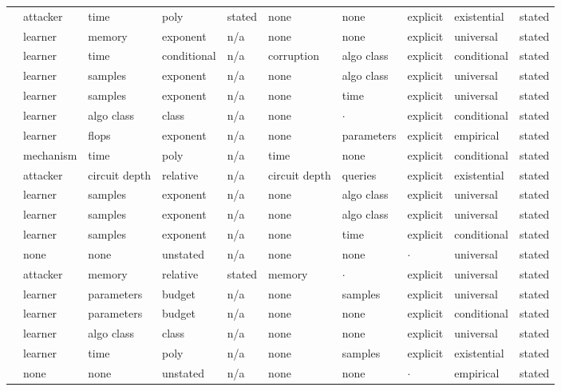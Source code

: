 \begin{landscape}
\begin{longtable}{rlllllllll}
\cite{CGH04} & attacker & time & poly & stated & none & none & explicit & existential & stated \\
\cite{Raz16} & learner & memory & exponent & n/a & none & none & explicit & universal & stated \\
\cite{BB20} & learner & time & conditional & n/a & corruption & algo class & explicit & conditional & stated \\
\cite{ADKPS24} & learner & samples & exponent & n/a & none & algo class & explicit & universal & stated \\
\cite{DTAPZK24} & learner & samples & exponent & n/a & none & time & explicit & universal & stated \\
\cite{HKKLMT26} & learner & algo class & class & n/a & none & $\cdot$ & explicit & conditional & stated \\
\cite{KMHBCCGRWA20} & learner & flops & exponent & n/a & none & parameters & explicit & empirical & stated \\
\cite{BCV16} & mechanism & time & poly & n/a & time & none & explicit & conditional & stated \\
\cite{GM24} & attacker & circuit depth & relative & n/a & circuit depth & queries & explicit & existential & stated \\
\cite{LOSW24} & learner & samples & exponent & n/a & none & algo class & explicit & universal & stated \\
\cite{Gla24} & learner & samples & exponent & n/a & none & algo class & explicit & universal & stated \\
\cite{JKMS25} & learner & samples & exponent & n/a & none & time & explicit & conditional & stated \\
\cite{DP20} & none & none & unstated & n/a & none & none & $\cdot$ & universal & stated \\
\cite{DQW23} & attacker & memory & relative & stated & memory & $\cdot$ & explicit & universal & stated \\
\cite{HG25} & learner & parameters & budget & n/a & none & samples & explicit & universal & stated \\
\cite{BS21} & learner & parameters & budget & n/a & none & none & explicit & conditional & stated \\
\cite{KLNRS08} & learner & algo class & class & n/a & none & none & explicit & universal & stated \\
\cite{ZSWB22} & learner & time & poly & n/a & none & samples & explicit & existential & stated \\
\cite{BLW25} & none & none & unstated & n/a & none & none & $\cdot$ & empirical & stated \\
\end{longtable}
\endgroup
\end{landscape}

